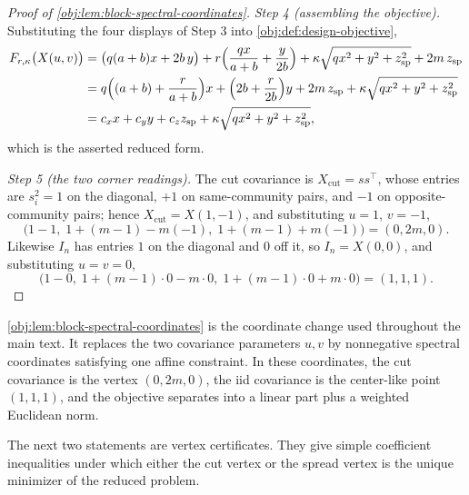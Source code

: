 \documentclass[11pt]{article}
\begin{document}
\begin{proof}[Proof of \cref{obj:lem:block-spectral-coordinates}]
\emph{Step 4 (assembling the objective).}  Substituting the four displays of Step 3 into \cref{obj:def:design-objective},
\[
\begin{aligned}
F_{r,\kappa}\bigl(X(u,v)\bigr)
&=\bigl(q(a+b)x+2b\,y\bigr)
+r\Bigl(\frac{qx}{a+b}+\frac{y}{2b}\Bigr)
+\kappa\sqrt{qx^2+y^2+z_{\mathrm{sp}}^2}
+2m\,z_{\mathrm{sp}}\\
&=q\Bigl((a+b)+\frac{r}{a+b}\Bigr)x
+\Bigl(2b+\frac{r}{2b}\Bigr)y
+2m\,z_{\mathrm{sp}}
+\kappa\sqrt{qx^2+y^2+z_{\mathrm{sp}}^2}\\
&=c_xx+c_yy+c_zz_{\mathrm{sp}}
+\kappa\sqrt{qx^2+y^2+z_{\mathrm{sp}}^2},
\end{aligned}
\]
which is the asserted reduced form. %

\emph{Step 5 (the two corner readings).}  The cut covariance is \(X_{\mathrm{cut}}=ss^\top\), whose entries are \(s_i^2=1\) on the diagonal, \(+1\) on same-community pairs, and \(-1\) on opposite-community pairs; hence \(X_{\mathrm{cut}}=X(1,-1)\), and substituting \(u=1\), \(v=-1\),
\[
\bigl(1-1,\;1+(m-1)-m(-1),\;1+(m-1)+m(-1)\bigr)=(0,2m,0).
\]
Likewise \(I_n\) has entries \(1\) on the diagonal and \(0\) off it, so \(I_n=X(0,0)\), and substituting \(u=v=0\),
\[
\bigl(1-0,\;1+(m-1)\cdot0-m\cdot0,\;1+(m-1)\cdot0+m\cdot0\bigr)=(1,1,1).
\]
\end{proof}

\cref{obj:lem:block-spectral-coordinates} is the coordinate change used throughout the main text. It replaces the two covariance parameters \(u,v\) by nonnegative spectral coordinates satisfying one affine constraint. In these coordinates, the cut covariance is the vertex \((0,2m,0)\), the iid covariance is the center-like point \((1,1,1)\), and the objective separates into a linear part plus a weighted Euclidean norm.

The next two statements are vertex certificates. They give simple coefficient inequalities under which either the cut vertex or the spread vertex is the unique minimizer of the reduced problem.
\end{document}
